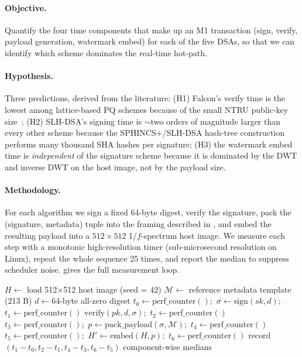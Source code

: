 \documentclass[11pt,a4paper]{article}
\theoremstyle{definition}
\theoremstyle{plain}
\theoremstyle{remark}
\begin{document}
\paragraph{Objective.}
Quantify the four time components that make up an M1 transaction
(sign, verify, payload generation, watermark embed) for each of the
five DSAs, so that we can identify which scheme dominates the
real-time hot-path.

\paragraph{Hypothesis.}
Three predictions, derived from the literature: (H1) Falcon's verify
time is the lowest among lattice-based PQ schemes because of the small
NTRU public-key size~\cite{bib31}; (H2) SLH-DSA's signing time is
$\sim$two orders of magnitude larger than every other scheme because
the SPHINCS+/SLH-DSA hash-tree construction~\cite{bib33} performs many
thousand SHA hashes per signature; (H3) the watermark embed time is
\emph{independent} of the signature scheme because it is dominated by
the DWT and inverse DWT on the host image, not by the payload size.

\paragraph{Methodology.}
For each algorithm we sign a fixed 64-byte digest, verify the
signature, pack the (signature, metadata) tuple into the framing
described in , and embed the resulting payload into a
$512\!\times\!512$ 1/$f$-spectrum host image. We measure each step
with a monotonic high-resolution timer (sub-microsecond resolution
on Linux), repeat the whole sequence 25 times, and report the
median to suppress scheduler noise.  gives the full
measurement loop.

\begin{algorithm}[!ht]
\caption{Experiment 1 measurement loop, per algorithm.}\label{alg:exp1}
\begin{algorithmic}[1]
\State $H \gets$ load 512$\times$512 host image (seed = 42)
\State $\mathcal{M} \gets$ reference metadata template (213 B)
\State $d \gets 64$-byte all-zero digest
    \State $t_0 \gets \mathrm{perf\_counter}()$;\
           $\sigma \gets \mathrm{sign}(\mathit{sk}, d)$;\
           $t_1 \gets \mathrm{perf\_counter}()$
    \State $\mathrm{verify}(\mathit{pk}, d, \sigma)$;\
           $t_2 \gets \mathrm{perf\_counter}()$
    \State $t_3 \gets \mathrm{perf\_counter}()$;\
           $p \gets \mathrm{pack\_payload}(\sigma, \mathcal{M})$;\
           $t_4 \gets \mathrm{perf\_counter}()$
    \State $t_5 \gets \mathrm{perf\_counter}()$;\
           $H' \gets \mathrm{embed}(H, p)$;\
           $t_6 \gets \mathrm{perf\_counter}()$
    \State record $(t_1\!-\!t_0, t_2\!-\!t_1, t_4\!-\!t_3, t_6\!-\!t_5)$
\EndFor
\State \Return component-wise medians
\end{algorithmic}
\end{algorithm}
\end{document}
